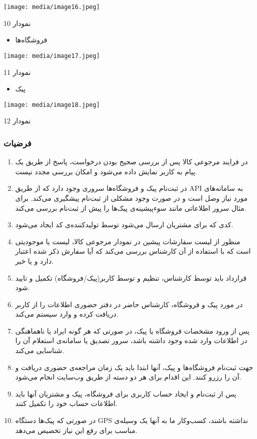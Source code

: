 \documentclass[]{article}
\begin{document}
\texttt{[image: media/image16.jpeg]}

نمودار 10

\begin{itemize}
\item
  فروشگاه‌ها
\end{itemize}

\texttt{[image: media/image17.jpeg]}

نمودار 11

\begin{itemize}
\item
  پیک
\end{itemize}

\texttt{[image: media/image18.jpeg]}

نمودار 12

\subsubsection{فرضیات}\label{ux641ux631ux636ux6ccux627ux62a-1}

\begin{enumerate}
\def\labelenumi{\arabic{enumi})}
\item
  در فرایند مرجوعی کالا پس از بررسی صحیح بودن درخواست، پاسخ از طریق یک
  پیام به کاربر نمایش داده می‌شود و امکان بررسی مجدد نیست.
\item
  در ثبت‌نام پیک و فروشگاه‌ها سروری وجود دارد که از طریق API به
  سامانه‌های مورد نیاز وصل است و در صورت وجود مشکلی از ثبت‌نام پیشگیری
  می‌کند. برای مثال سرور اطلاعاتی مانند سوءپیشینه‌ی پیک‌ها را پیش از
  ثبت‌نام بررسی می‌کند.
\item
  کدی که برای مشتریان ارسال می‌شود توسط تولید‌کننده‌ی کد ایجاد می‌شود.
\item
  منظور از لیست سفارشات پیشین در نمودار مرجوعی کالا، لیست یا موجودیتی
  است که با استفاده از آن کارشناس بررسی می‌کند که آیا سفارش ذکر شده
  اعتبار دارد و یا خیر.
\item
  قرارداد باید توسط کارشناس، تنظیم و توسط کاربر(پیک/فروشگاه) تکمیل و
  تایید شود.
\item
  در مورد پیک و فروشگاه، کارشناس حاضر در دفتر حضوری اطلاعات را از کاربر
  دریافت کرده و وارد سیستم می‌کند.
\item
  پس از ورود مشخصات فروشگاه یا پیک، در صورتی که هر گونه ایراد یا
  ناهماهنگی در اطلاعات وارد شده وجود داشته باشد، سرور تصدیق یا سامانه‌ی
  استعلام آن را شناسایی می‌کند.
\item
  جهت ثبت‌نام فروشگاه‌ها و پیک، آنها ابتدا باید یک زمان مراجعه‌ی حضوری
  دریافت و آن را رزرو کنند. این اقدام برای هر دو دسته از طریق وب‌سایت
  انجام می‌شود.
\item
  پس از ثبت‌نام و ایجاد حساب کاربری برای فروشگاه، پیک و مشتریان آنها
  باید اطلاعات حساب خود را تکمیل کنند.
\item
  در صورتی که پیک‌ها دستگاه GPS نداشته باشند، کسب‌وکار ما به آنها یک
  وسیله‌ی مناسب برای رفع این نیاز تخصیص می‌دهد.
\end{enumerate}
\end{document}
